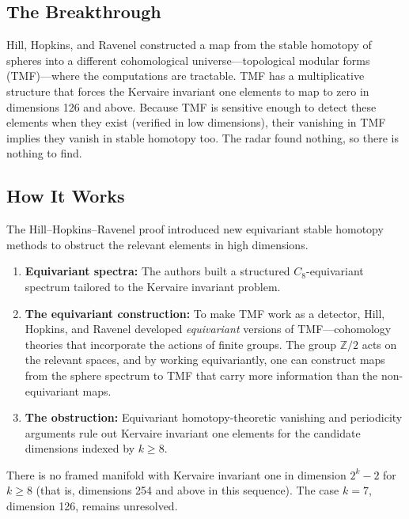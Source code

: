 \subsection{The Breakthrough}

Hill, Hopkins, and Ravenel constructed a map from the stable homotopy of spheres into a different cohomological universe---topological modular forms (TMF)---where the computations are tractable. TMF has a multiplicative structure that forces the Kervaire invariant one elements to map to zero in dimensions 126 and above. Because TMF is sensitive enough to detect these elements when they exist (verified in low dimensions), their vanishing in TMF implies they vanish in stable homotopy too. The radar found nothing, so there is nothing to find.

\subsection{How It Works}

The Hill--Hopkins--Ravenel proof introduced new equivariant stable homotopy methods to obstruct the relevant elements in high dimensions.

\begin{enumerate}
\item \textbf{Equivariant spectra:} The authors built a structured $C_8$-equivariant spectrum tailored to the Kervaire invariant problem.

\item \textbf{The equivariant construction:} To make TMF work as a detector, Hill, Hopkins, and Ravenel developed \emph{equivariant} versions of TMF---cohomology theories that incorporate the actions of finite groups. The group $\mathbb{Z}/2$ acts on the relevant spaces, and by working equivariantly, one can construct maps from the sphere spectrum to TMF that carry more information than the non-equivariant maps.

\item \textbf{The obstruction:} Equivariant homotopy-theoretic vanishing and periodicity arguments rule out Kervaire invariant one elements for the candidate dimensions indexed by $k\geq8$.
\end{enumerate}

\begin{theorem}
There is no framed manifold with Kervaire invariant one in dimension $2^k-2$ for $k\geq8$ (that is, dimensions 254 and above in this sequence). The case $k=7$, dimension 126, remains unresolved.
\end{theorem}

